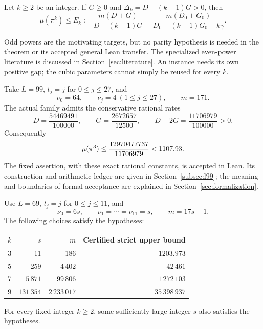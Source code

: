 \begin{theorem}\label{thm:main}
Let \(k\ge2\) be an integer. If \(G\ge0\) and
\(\Delta_k=D-(k-1)G>0\), then
\begin{equation}\label{eq:mainbound}
\boxed{\displaystyle
\mu(\pi^k)\le E_k:=
\frac{m(D+G)}{D-(k-1)G}
=\frac{m(D_0+G_0)}
 {D_0-(k-1)G_0+k\gamma}.}
\end{equation}
\end{theorem}

Odd powers are the motivating targets, but no parity hypothesis is
needed in the theorem or its accepted general Lean transfer. The
specialized even-power literature is discussed in
Section~\ref{sec:literature}. An instance needs its own positive gap;
the cubic parameters cannot simply be reused for every \(k\).

\begin{corollary}\label{cor:l99}
Take \(L=99\), \(t_j=j\) for \(0\le j\le27\), and
\[
\nu_0=64,\qquad \nu_j=4\ (1\le j\le27),\qquad m=171.
\]
The actual family admits the conservative rational rates
\[
D=\frac{54469491}{100000},\qquad
G=\frac{2672657}{12500},\qquad D-2G=\frac{11706979}{100000}>0.
\]
Consequently
\[
\mu(\pi^3)\le\frac{12970477737}{11706979}<1107.93.
\]
The fixed assertion, with these exact rational constants, is accepted
in Lean. Its construction and arithmetic ledger are given in
Section~\ref{subsec:l99}; the meaning and boundaries of formal
acceptance are explained in Section~\ref{sec:formalization}.
\end{corollary}

\begin{corollary}\label{cor:numerical}
Use \(L=69\), \(t_j=j\) for \(0\le j\le11\), and
\[
\nu_0=6s,\qquad \nu_1=\cdots=\nu_{11}=s,\qquad m=17s-1.
\]
The following choices satisfy the hypotheses:
\begin{center}
\begin{tabular}{rrrr}
\toprule
\(k\)&\(s\)&\(m\)&Certified strict upper bound\\
\midrule
3&11&186&\(1203.973\)\\
5&259&\(4\,402\)&\(42\,461\)\\
7&\(5\,871\)&\(99\,806\)&\(1\,272\,103\)\\
9&\(131\,354\)&\(2\,233\,017\)&\(35\,398\,937\)\\
\bottomrule
\end{tabular}
\end{center}
For every fixed integer \(k\ge2\), some sufficiently large integer \(s\)
also satisfies the hypotheses.
\end{corollary}


